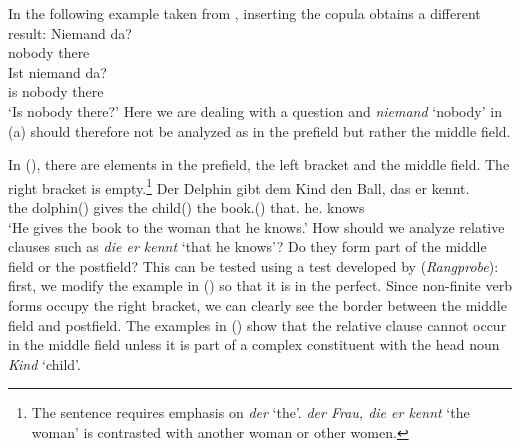 In the following example taken from \citet[]{Paul1919a}, inserting the copula obtains a different result: 
\eal
\ex 
\gll Niemand da?\\
	 nobody there\\
\ex 
\gll Ist niemand da?\\
	 is nobody there\\
\glt `Is nobody there?'
\zl
Here we are dealing with a question and \emph{niemand} `nobody' in (a) should therefore not be analyzed as in the prefield but rather the middle field.

In (), there are elements in the prefield, the left bracket and the middle field. The right
bracket is empty.\footnote{%
  The sentence requires emphasis on \emph{der} `the'. \emph{der Frau, die er kennt} `the woman' is
  contrasted with another woman or other women.
}
\ea
\gll Der Delphin  gibt  dem Kind        den Ball,       das er kennt.\\
     the dolphin(\mas) gives the child(\neu) the book.(\mas) that.\neu{} he.\mas{} knows\\
\glt `He gives the book to the woman that he knows.'
\z 
How should we analyze relative clauses such as
\emph{die er kennt} `that he knows'? Do they form part of the middle field or the postfield?
This can be tested using a test developed by \citet[]{Bech55a} (\emph{Rangprobe}):
first, we modify the example in () so that it is in the perfect. Since non-finite verb forms occupy the right bracket, we
can clearly see the border between the middle field and postfield. The examples in () show that the relative clause cannot
occur in the middle field unless it is part of a complex constituent with the head noun \emph{Kind} `child'.
\eal
{}
\zl

